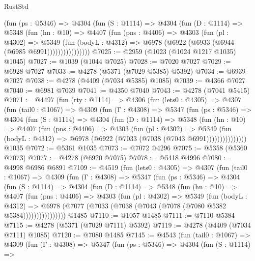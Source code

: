 \begin{lexlean}{RustStd}
\begin{coremodule}
              (fun (ps : @5346) =>
              @4304
                (fun (S : @1114) =>
                @4304
                  (fun (D : @1114) =>
                  @5348
                    (fun (hn : @10) =>
                    @4407
                      (fun (pns : @4406) =>
                      @4303
                        (fun (pl : @4302) =>
                        @5349
                          (fun (bodyL : @4312) =>
                          @6978 (@6922 (@6933 (@6944 (@6985 @6991))))))))))))))))
@7025 := @2959 (@1023 (@1024 @1217 @1035) @1045)
@7027 := @1039 (@1044 @7025)
@7028 := @7020 @7027
@7029 := @6928 @7027
@7033 := @4278 (@5371 (@7029 @5385) @5392)
@7034 := @6939 @7027
@7038 := @4278 (@4409 (@7034 @5385) @1085)
@7039 := @4366 @7027
@7040 := @6981 @7039
@7041 := @4350 @7040
@7043 := @4278 (@7041 @5415)
@7071 := @4497
    (fun (rty : @1114) =>
    @4306
      (fun (lets0 : @4305) =>
      @4307
        (fun (tail0 : @1067) =>
        @4309
          (fun (Γ : @4308) =>
          @5347
            (fun (ps : @5346) =>
            @4304
              (fun (S : @1114) =>
              @4304
                (fun (D : @1114) =>
                @5348
                  (fun (hn : @10) =>
                  @4407
                    (fun (pns : @4406) =>
                    @4303
                      (fun (pl : @4302) =>
                      @5349
                        (fun (bodyL : @4312) =>
                        @6978 (@6922 (@7033 (@7038 (@7043 @6991)))))))))))))))
    @1035
@7072 := @5361 @1035
@7073 := @7072 @4296
@7075 := @5358 (@5360 @7073)
@7077 := @4278 (@6920 @7075)
@7078 := @5418 @4996
@7080 := @4998 @6986 @6891
@7109 := @4519
    (fun (lets0 : @4305) =>
    @4307
      (fun (tail0 : @1067) =>
      @4309
        (fun (Γ : @4308) =>
        @5347
          (fun (ps : @5346) =>
          @4304
            (fun (S : @1114) =>
            @4304
              (fun (D : @1114) =>
              @5348
                (fun (hn : @10) =>
                @4407
                  (fun (pns : @4406) =>
                  @4303
                    (fun (pl : @4302) =>
                    @5349
                      (fun (bodyL : @4312) =>
                      @6978 (@7077 (@7033 (@7038 (@7043 (@7078 (@7080 @5382 @5384))))))))))))))))
    @1485
@7110 := @1057 @1485
@7111 := @7110 @5384
@7115 := @4278 (@5371 (@7029 @7111) @5392)
@7119 := @4278 (@4409 (@7034 @7111) @1085)
@7120 := @7080 @1485
@7145 := @4543
    (fun (tail0 : @1067) =>
    @4309
      (fun (Γ : @4308) =>
      @5347
        (fun (ps : @5346) =>
        @4304
          (fun (S : @1114) =>

\end{coremodule}
\end{lexlean}
